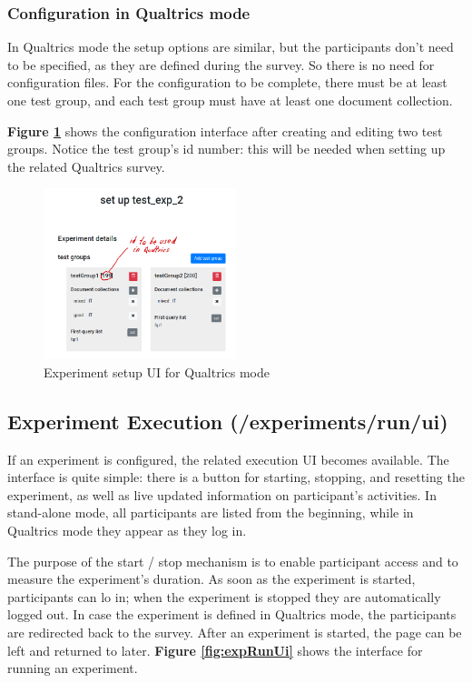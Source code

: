 \documentclass[fleqn]{article}
\begin{document}
\newpage

\subsubsection{Configuration in Qualtrics mode}

In Qualtrics mode the setup options are similar, but the participants don't need to be specified, as they are defined during the survey.
So there is no need for configuration files. For the configuration to be complete, there must be at least one test group, and each test group
must have at least one document collection. 

\textbf{Figure \ref{fig:expSetupUi2}} shows the configuration interface after creating and editing
two test groups. Notice the test group's id number: this will be needed when setting up the related Qualtrics survey. 

\begin{figure} [h]
\centering
\includegraphics[width=0.5\textwidth]{img/expSetupUi2}
\caption{Experiment setup UI for Qualtrics mode}
\label{fig:expSetupUi2}
\end{figure}

\newpage

\subsection{Experiment Execution \small{(/experiments/run/ui)}}

If an experiment is configured, the related execution UI becomes available. The interface is quite simple: there is a button
for starting, stopping, and resetting the experiment, as well as live updated information on participant's activities.
In stand-alone mode, all participants are listed from the beginning, while in Qualtrics mode they appear as they log in.

The purpose of the start / stop mechanism is to enable participant access and to measure the experiment's duration. As
soon as the experiment is started, participants can lo in; when the experiment is stopped they are automatically logged out.
In case the experiment is defined in Qualtrics mode, the participants are redirected back to the survey.
After an experiment is started, the page can be left and returned to later.
\textbf{Figure \ref{fig:expRunUi}} shows the interface for running an experiment.
\end{document}
